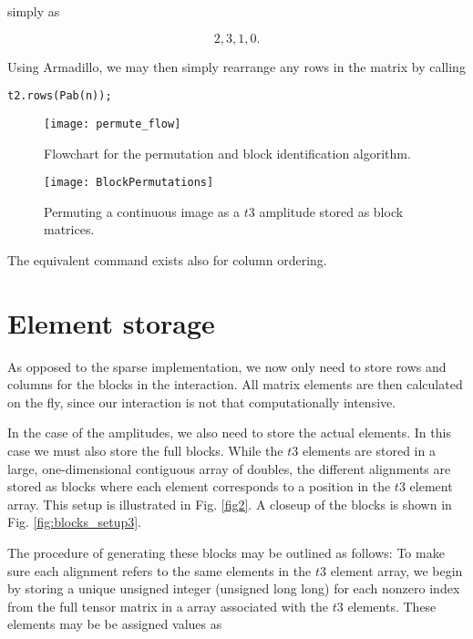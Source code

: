 simply as 

\begin{equation}
2, 3, 1, 0.
\end{equation}

Using Armadillo, we may then simply rearrange any rows in the matrix by calling

\begin{verbatim}
t2.rows(Pab(n));
\end{verbatim}

\begin{figure}[p]
    \centering
    \texttt{[image: permute\_flow]}
    \caption{Flowchart for the permutation and block identification algorithm.}
    \label{fig:permute_flow}
\end{figure}

\begin{figure}[p]
    \centering
    \texttt{[image: BlockPermutations]}
    \caption{Permuting a continuous image as a $t3$ amplitude stored as block matrices.}
    \label{fig:BlockPermutations}
\end{figure}

The equivalent command exists also for column ordering. 

\section{Element storage}

As opposed to the sparse implementation, we now only need to store rows and columns for the blocks in the interaction. All matrix elements are then calculated on the fly, since our interaction is not that computationally intensive.

In the case of the amplitudes, we also need to store the actual elements. In this case we must also store the full blocks. While the $t3$ elements are stored in a large, one-dimensional contiguous array of doubles, the different alignments are stored as blocks where each element corresponds to a position in the $t3$ element array. This setup is illustrated in Fig. \ref{fig2}. A closeup of the blocks is shown in Fig. \ref{fig:blocks_setup3}. 

The procedure of generating these blocks may be outlined as follows: To make sure each alignment refers to the same elements in the $t3$ element array, we begin by storing a unique unsigned integer (unsigned long long) for each nonzero index from the full tensor matrix in a array associated with the $t3$ elements. These elements may be be assigned values as

